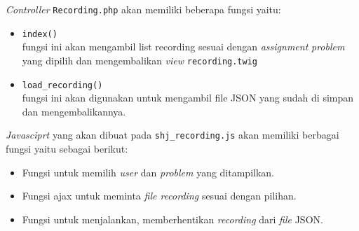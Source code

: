 \textit{Controller} \verb|Recording.php| akan memiliki beberapa fungsi yaitu:
\begin{itemize}
      \item \verb|index()| \\
            fungsi ini akan mengambil list recording sesuai dengan \textit{assignment} \textit{problem} yang dipilih dan mengembalikan \textit{view} \verb|recording.twig|
      \item \verb|load_recording()| \\
            fungsi ini akan digunakan untuk mengambil file JSON yang sudah di simpan dan mengembalikannya.
\end{itemize}

\textit{Javasciprt} yang akan dibuat pada \verb|shj_recording.js| akan memiliki berbagai fungsi yaitu sebagai berikut:

\begin{itemize}
      \item Fungsi untuk memilih \textit{user} dan \textit{problem} yang ditampilkan.
      \item Fungsi ajax untuk meminta \textit{file recording} sesuai dengan pilihan.
      \item Fungsi untuk menjalankan, memberhentikan \textit{recording} dari \textit{file} JSON.
\end{itemize}

\begin{comment}
Pemuratar ulang, bikin halaman baru. ada list user-nya, problemnya, di click baru kaya ngeload gt dari folder assignment.
\end{comment}